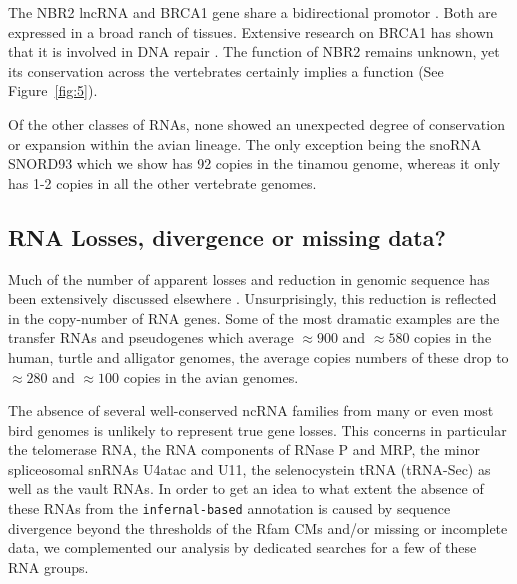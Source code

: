 \documentclass[10pt]{bmc_article}
\newenvironment{bmcformat}{\begin{raggedright}\baselineskip20pt\sloppy\setboolean{publ}{false}}{\end{raggedright}\baselineskip20pt\sloppy}
\begin{document}
\begin{bmcformat}
The NBR2 lncRNA and BRCA1 gene share a bidirectional promotor
\cite{Xu:1997}. Both are expressed in a broad ranch of
tissues. Extensive research on BRCA1 has shown that it is involved in
DNA repair \cite{Moynahan:1999}. The function of NBR2 remains unknown,
yet its conservation across the vertebrates certainly implies a
function (See Figure~\ref{fig:5}).

Of the other classes of RNAs, none showed an unexpected degree of
conservation or expansion within the avian lineage. The only exception
being the snoRNA SNORD93 which we show has 92 copies in the tinamou
genome, whereas it only has 1-2 copies in all the other vertebrate
genomes. 

\subsection*{RNA Losses, divergence or missing data?}

Much of the number of apparent losses and reduction in genomic
sequence has been extensively discussed elsewhere
\cite{Organ:2007}. Unsurprisingly, this reduction is reflected in the
copy-number of RNA genes. Some of the most dramatic examples are the
transfer RNAs and pseudogenes which average $\approx 900$ and $\approx
580$ copies in the human, turtle and alligator genomes, the average
copies numbers of these drop to $\approx 280$ and $\approx 100$ copies
in the avian genomes. 

The absence of several well-conserved ncRNA families from many or even most
bird genomes is unlikely to represent true gene losses. This concerns in
particular the telomerase RNA, the RNA components of RNase P and MRP, the
minor spliceosomal snRNAs U4atac and U11, the selenocystein tRNA (tRNA-Sec)
as well as the vault RNAs. In order to get an idea to what extent the
absence of these RNAs from the \texttt{infernal-based} annotation is caused 
by sequence divergence beyond the thresholds of the Rfam CMs and/or 
missing or incomplete data, we complemented our analysis by dedicated
searches for a few of these RNA groups. 


\end{bmcformat}
\end{document}
